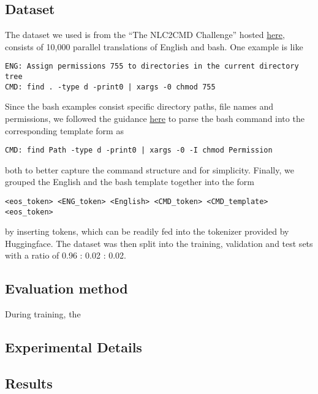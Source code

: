 \subsection{Dataset}
The dataset we used is from the ``The NLC2CMD Challenge'' hosted
\href{https://nlc2cmd.us-east.mybluemix.net/}{here}, consists of 10,000 parallel translations of English and bash. One example is like
\begin{verbatim}
ENG: Assign permissions 755 to directories in the current directory tree
CMD: find . -type d -print0 | xargs -0 chmod 755
\end{verbatim}
Since the bash examples consist specific directory paths, file names and permissions, we followed the guidance \href{https://github.com/IBM/clai/tree/nlc2cmd}{here} to parse the bash command into the corresponding template form as
\begin{verbatim}
CMD: find Path -type d -print0 | xargs -0 -I chmod Permission
\end{verbatim}
both to better capture the command structure and for simplicity. Finally, we grouped the English and the bash template together into the form
\begin{verbatim}
<eos_token> <ENG_token> <English> <CMD_token> <CMD_template> <eos_token> 
\end{verbatim}
by inserting tokens, which can be readily fed into the tokenizer provided by Huggingface. The dataset was then split into the training, validation and test sets with a ratio of 0.96 : 0.02 : 0.02.

\subsection{Evaluation method}
During training, the 
\subsection{Experimental Details}
\subsection{Results}